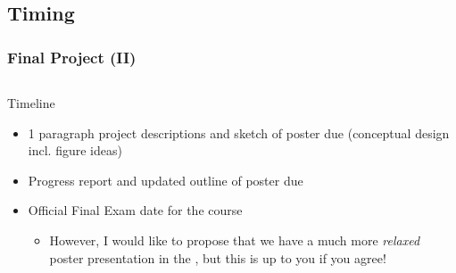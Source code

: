 \documentclass[hyperref={colorlinks=true}]{beamer}
\begin{document}
\subsection[Timing]{Timing}


\begin{frame}%
  \frametitle{Final Project (II)}

  \begin{columns}
  
    
  \begin{ucblock}{Timeline}
    \begin{itemize}
      \item {} 1 paragraph project descriptions and sketch of poster due (conceptual design incl. figure ideas)
      \item {} Progress report and updated outline of poster due
      \item {} Official Final Exam date for the course
      \begin{itemize}
        \item However, I would like to propose that we have a much more \textit{relaxed} poster presentation in the , but this is up to you if you agree!
      \end{itemize}
    \end{itemize}
  \end{ucblock}
  
  
  \vspace{-1cm}
  

\end{columns}
\end{frame}
\end{document}
